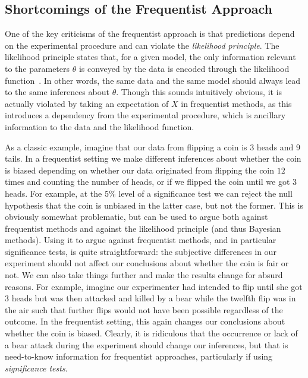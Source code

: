 \subsection{Shortcomings of the Frequentist Approach}
\label{sec:bayes:religion:freq}

One of the key criticisms of the frequentist approach is that predictions depend on the experimental procedure and
can violate the \emph{likelihood principle}.  The likelihood principle states that, for a given model, 
the only information relevant
to the parameters $\theta$ is conveyed by the data is encoded through the likelihood function~\citep{robert2007bayesian}.  
In other words, the same data and 
the same model should always lead to the same inferences about $\theta$.  Though this sounds intuitively obvious, it is actually violated by
taking an expectation of $X$ in frequentist methods, as this introduces a dependency from the experimental procedure, which
is ancillary information to the data and the likelihood function.  

As a classic example, 
imagine that our data from flipping a coin is $3$ heads and $9$ tails.
In a frequentist setting we make different inferences about whether the coin is biased 
depending on whether our data originated from flipping the coin $12$ times and counting the number of heads, or if we 
flipped the coin until we got $3$ heads.  For example, at the $5\%$ level of a significance test we can reject the null
hypothesis that the coin is unbiased in the latter case, but not the former.  This is obviously somewhat problematic, but
can be used to argue both against frequentist methods and against the likelihood principle (and thus Bayesian methods).  Using it
to argue against frequentist methods, and in particular significance tests, is quite straightforward: the subjective
differences in our experiment should not affect our conclusions about whether the coin is fair or not.  We can also take things
further and make the results change for absurd reasons.  For example, imagine our experimenter had intended to flip until she got
$3$ heads but was then attacked and killed by a bear while the twelfth flip was in the air such that further flips would not
have been possible regardless of the outcome.  In the frequentist setting, this again changes our conclusions
about whether the coin is biased.  Clearly, it is ridiculous that the occurrence or lack of a bear attack during the experiment
should change our inferences, but that is need-to-know information for frequentist approaches, particularly if using \emph{significance tests}.

